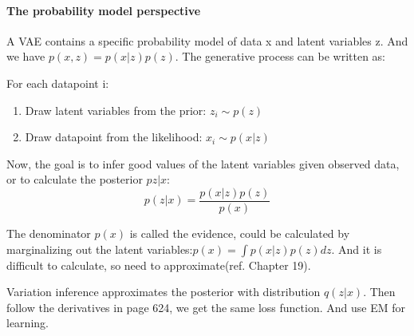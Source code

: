 \documentclass[12pt]{article}
\numberwithin{equation}{section}
\begin{document}
	\paragraph{The probability model perspective} \par
	A VAE contains a specific probability model of data x and latent variables z. And we have $p(x,z)=p(x|z)p(z)$. The generative process can be written as: \par
	For each datapoint i:
	\begin{enumerate}
		\item Draw latent variables from the prior: $z_i \sim p(z)$
		\item Draw datapoint from the likelihood: $x_i \sim p(x|z)$
	\end{enumerate} \par
	Now, the goal is to infer good values of the latent variables given observed data, or to calculate the posterior $p{z|x}$:
	\begin{equation}
		p(z|x)=\frac{p(x|z)p(z)}{p(x)}
	\end{equation} \par
	The denominator $p(x)$ is called the evidence, could be calculated by marginalizing out the latent variables:$p(x)=\int p(x|z)p(z)dz$. And it is difficult to calculate, so need to approximate(ref. Chapter 19). \par
	Variation inference approximates the posterior with distribution $q(z|x)$. Then follow the derivatives in page 624, we get the same loss function. And use EM for learning. \par
\end{document}
